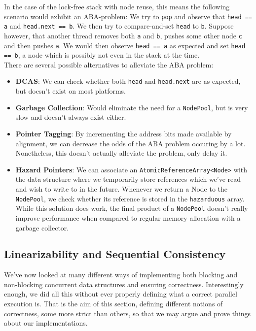 \documentclass[main]{subfiles}
\begin{document}
In the case of the lock-free stack with node reuse, this means the following scenario would exhibit an ABA-problem: We try to \texttt{pop} and observe that \texttt{head == a} and \texttt{head.next == b}. We then try to compare-and-set \texttt{head} to \texttt{b}. Suppose however, that another thread removes both \texttt{a} and \texttt{b}, pushes some other node \texttt{c} and then pushes \texttt{a}. We would then observe \texttt{head == a} as expected and set \texttt{head == b}, a node which is possibly not even in the stack at the time.\\[3mm]
There are several possible alternatives to alleviate the ABA problem:
\begin{itemize}
    \item \textbf{DCAS}: We can check whether both \texttt{head} and \texttt{head.next} are as expected, but doesn't exist on most platforms.
    \item \textbf{Garbage Collection}: Would eliminate the need for a \texttt{NodePool}, but is very slow and doesn't always exist either.
    \item \textbf{Pointer Tagging}: By incrementing the address bits made available by alignment, we can decrease the odds of the ABA problem occuring by a lot. Nonetheless, this doesn't actually alleviate the problem, only delay it.
    \item \textbf{Hazard Pointers}: We can associate an \texttt{AtomicReferenceArray<Node>} with the data structure where we temporarily store references which we've read and wish to write to in the future. Whenever we return a Node to the \texttt{NodePool}, we check whether its reference is stored in the \texttt{hazarduous} array. While this solution does work, the final product of a \texttt{NodePool} doesn't really improve performance when compared to regular memory allocation with a garbage collector. 
\end{itemize}

\newpage


\subsection{Linearizability and Sequential Consistency}
We've now looked at many different ways of implementing both blocking and non-blocking concurrent data structures and ensuring correctness. Interestingly enough, we did all this without ever properly defining what a correct parallel execution is. That is the aim of this section, defining different notions of correctness, some more strict than others, so that we may argue and prove things about our implementations.
\end{document}
